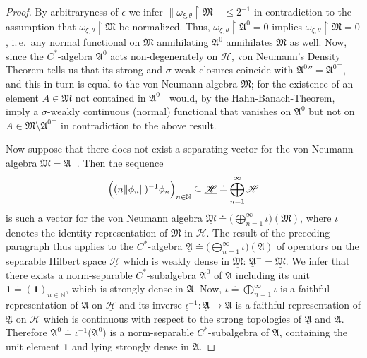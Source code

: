 \documentclass[11pt,twoside,openright]{report}
\theoremstyle{definition}
\theoremstyle{plain}
\theoremstyle{remark}
\theoremstyle{assumption}
\newcommand{\norm}[1]{\lVert #1 \rVert}
\newcommand{\Nbb}{\mathbb{N}}
\newcommand{\Afrak}{\mathfrak{A}}
\newcommand{\Mfrak}{\mathfrak{M}}
\newcommand{\Hscr}{\mathscr{H}}
\newcommand{\unit}{\mathbf{1}}
\begin{document}
\begin{proof}
  By arbitraryness of $\epsilon$ we infer $\norm{\omega_{\xi , \theta}
  \restriction \Mfrak} \leqslant 2^{-1}$ in contradiction to the
  assumption that $\omega_{\xi , \theta} \restriction \Mfrak$ be
  normalized. Thus, $\omega_{\xi , \theta} \restriction \Afrak^0 = 0$
  implies $\omega_{\xi , \theta} \restriction \Mfrak = 0$, i.\,e.~any
  normal functional on $\Mfrak$ annihilating $\Afrak^0$ annihilates
  $\Mfrak$ as well. Now, since the $C^*$-algebra $\Afrak^0$ acts
  non-degenerately on $\Hscr$, von Neumann's Density Theorem tells us
  that its strong and $\sigma$-weak closures coincide with
  ${\Afrak^0}'' = {\Afrak^0}^-$, and this in turn is equal to the von
  Neumann algebra $\Mfrak$; for the existence of an element $A \in
  \Mfrak$ not contained in ${\Afrak^0}^-$ would, by the
  Hahn-Banach-Theorem, imply a $\sigma$-weakly continuous (normal)
  functional that vanishes on $\Afrak^0$ but not on $A \in \Mfrak
  \setminus {\Afrak^0}^-$ in contradiction to the above result.

  Now suppose that there does not exist a separating vector for the
  von Neumann algebra $\Mfrak = \Afrak^-$. Then the sequence 
  \begin{equation*}
    \Bigl( ( n \norm{\phi_n} )^{-1} \phi_n \Bigr)_{n \in \Nbb}
    \subseteq \underline{\Hscr} \doteq \bigoplus_{n=1}^\infty \Hscr
  \end{equation*}
  is such a vector for the von Neumann algebra $\underline{\Mfrak}
  \doteq \bigl( \bigoplus_{n=1}^\infty \iota \bigr) ( \Mfrak )$, where
  $\iota$ denotes the identity representation of $\Mfrak$ in
  $\Hscr$. The result of the preceding paragraph thus applies to the
  $C^*$-algebra $\underline{\Afrak} \doteq \bigl(
  \bigoplus_{n=1}^\infty \iota \bigr) ( \Afrak )$ of operators on the
  separable Hilbert space $\underline{\Hscr}$ which is weakly dense in
  $\underline{\Mfrak}$: $\underline{\Afrak}^- =
  \underline{\Mfrak}$. We infer that there exists a norm-separable
  $C^*$-subalgebra $\underline{\Afrak}^0$ of $\underline{\Afrak}$
  including its unit $\underline{\unit} \doteq ( \unit )_{n \in
  \Nbb}$, which is strongly dense in $\underline{\Afrak}$. Now,
  $\underline{\iota} \doteq \bigoplus_{n=1}^\infty \iota$ is a
  faithful representation of $\Afrak$ on $\underline{\Hscr}$ and its
  inverse $\underline{\iota}^{-1} : \underline{\Afrak} \rightarrow
  \Afrak$ is a faithful representation of $\underline{\Afrak}$ on
  $\Hscr$ which is continuous with respect to the strong topologies of
  $\underline{\Afrak}$ and $\Afrak$. Therefore $\Afrak^0 \doteq
  \underline{\iota}^{-1} \bigl( \underline{\Afrak}^0 \bigr)$ is a
  norm-separable $C^*$-subalgebra of $\Afrak$, containing the unit
  element $\unit$ and lying strongly dense in $\Afrak$.
\end{proof}
\end{document}
